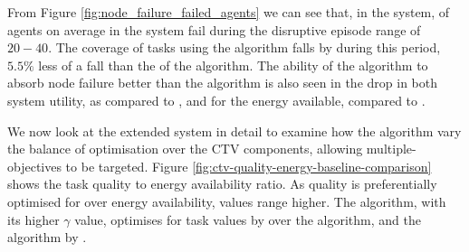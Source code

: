 
From Figure \ref{fig:node_failure_failed_agents} we can see that, in the \simulationNodeFailure{}{} system,  \resultsNodeFailureFailedAgentsBalancedDiff{}{} of agents on average in the system fail during the disruptive episode range of $20-40$. The coverage  of tasks using the \algorithmBalanced{}{} algorithm falls by \resultsNodeFailureCoverageBalancedDiff{}{} during this period, $5.5\%$ less of a fall than the \resultsNodeFailureCoverageQRoutingDiff{}{} of the \algorithmQRouting{}{} algorithm. The ability of the \algorithmBalanced{}{} algorithm to absorb node failure better than the \algorithmQRouting{}{} algorithm is also seen in the drop in both system utility, \resultsNodeFailureCTVBalancedImpactDiff{}{} as compared to \resultsNodeFailureCTVQRoutingImpactDiff{}{}, and for the energy available, \resultsNodeFailureCTVBalancedImpactDiff{}{} compared to \resultsNodeFailureCTVQRoutingImpactDiff{}{}.


	\label{fig:node_failure_failed_agents}

\label{fig:node_failure_coverage}
\label{fig:node_failure_ctv}
\label{fig:node_failure_cumulative_ctv}
\label{fig:node_failure_energy}
\label{fig:node_failure_cumulative_energy}


We now look at the extended system in detail to examine how the algorithm vary the balance  of optimisation over the CTV components, allowing multiple-objectives to be targeted. Figure 	\ref{fig:ctv-quality-energy-baseline-comparison} shows the task quality to energy availability ratio. 
As quality is preferentially optimised for over energy availability, values range higher. The \algorithmQuality{}{} algorithm, with its higher $\gamma$ value, optimises for task values by \resultsQEQualityEnd{}{} over the \algorithmEnergy{}{} algorithm, and the \algorithmDistribution{}{} algorithm by \resultsQEDistDiff{}{}. 

